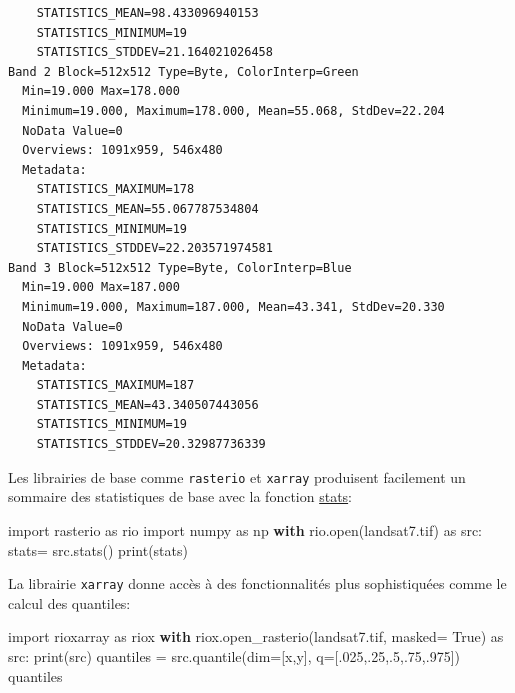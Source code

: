 \documentclass[
  11pt,
  letterpaper,
  open=any,
  twoside=false,
  french]{scrbook}
\newenvironment{Shaded}{\begin{snugshade}}{\end{snugshade}}
\newcommand{\BuiltInTok}[1]{\textcolor[rgb]{0.00,0.23,0.31}{#1}}
\newcommand{\ControlFlowTok}[1]{\textcolor[rgb]{0.00,0.23,0.31}{\textbf{#1}}}
\newcommand{\FloatTok}[1]{\textcolor[rgb]{0.68,0.00,0.00}{#1}}
\newcommand{\ImportTok}[1]{\textcolor[rgb]{0.00,0.46,0.62}{#1}}
\newcommand{\NormalTok}[1]{\textcolor[rgb]{0.00,0.23,0.31}{#1}}
\newcommand{\OperatorTok}[1]{\textcolor[rgb]{0.37,0.37,0.37}{#1}}
\newcommand{\StringTok}[1]{\textcolor[rgb]{0.13,0.47,0.30}{#1}}
\newcommand{\VariableTok}[1]{\textcolor[rgb]{0.07,0.07,0.07}{#1}}
\begin{document}
\begin{verbatim}
    STATISTICS_MEAN=98.433096940153
    STATISTICS_MINIMUM=19
    STATISTICS_STDDEV=21.164021026458
Band 2 Block=512x512 Type=Byte, ColorInterp=Green
  Min=19.000 Max=178.000 
  Minimum=19.000, Maximum=178.000, Mean=55.068, StdDev=22.204
  NoData Value=0
  Overviews: 1091x959, 546x480
  Metadata:
    STATISTICS_MAXIMUM=178
    STATISTICS_MEAN=55.067787534804
    STATISTICS_MINIMUM=19
    STATISTICS_STDDEV=22.203571974581
Band 3 Block=512x512 Type=Byte, ColorInterp=Blue
  Min=19.000 Max=187.000 
  Minimum=19.000, Maximum=187.000, Mean=43.341, StdDev=20.330
  NoData Value=0
  Overviews: 1091x959, 546x480
  Metadata:
    STATISTICS_MAXIMUM=187
    STATISTICS_MEAN=43.340507443056
    STATISTICS_MINIMUM=19
    STATISTICS_STDDEV=20.32987736339
\end{verbatim}

Les librairies de base comme \texttt{rasterio} et \texttt{xarray}
produisent facilement un sommaire des statistiques de base avec la
fonction
\href{https://rasterio.readthedocs.io/en/stable/api/rasterio.io.html\#rasterio.io.BufferedDatasetWriter.stats}{stats}:

\begin{Shaded}
\begin{Highlighting}[]
\ImportTok{import}\NormalTok{ rasterio }\ImportTok{as}\NormalTok{ rio}
\ImportTok{import}\NormalTok{ numpy }\ImportTok{as}\NormalTok{ np}
\ControlFlowTok{with}\NormalTok{ rio.}\BuiltInTok{open}\NormalTok{(}\StringTok{\textquotesingle{}landsat7.tif\textquotesingle{}}\NormalTok{) }\ImportTok{as}\NormalTok{ src:}
\NormalTok{    stats}\OperatorTok{=}\NormalTok{ src.stats()}
    \BuiltInTok{print}\NormalTok{(stats)}
\end{Highlighting}
\end{Shaded}

La librairie \texttt{xarray} donne accès à des fonctionnalités plus
sophistiquées comme le calcul des quantiles:

\begin{Shaded}
\begin{Highlighting}[]
\ImportTok{import}\NormalTok{ rioxarray }\ImportTok{as}\NormalTok{ riox}
\ControlFlowTok{with}\NormalTok{ riox.open\_rasterio(}\StringTok{\textquotesingle{}landsat7.tif\textquotesingle{}}\NormalTok{, masked}\OperatorTok{=} \VariableTok{True}\NormalTok{) }\ImportTok{as}\NormalTok{ src:}
    \BuiltInTok{print}\NormalTok{(src)}
\NormalTok{quantiles }\OperatorTok{=}\NormalTok{ src.quantile(dim}\OperatorTok{=}\NormalTok{[}\StringTok{\textquotesingle{}x\textquotesingle{}}\NormalTok{,}\StringTok{\textquotesingle{}y\textquotesingle{}}\NormalTok{], q}\OperatorTok{=}\NormalTok{[}\FloatTok{.025}\NormalTok{,}\FloatTok{.25}\NormalTok{,}\FloatTok{.5}\NormalTok{,}\FloatTok{.75}\NormalTok{,}\FloatTok{.975}\NormalTok{])}
\NormalTok{quantiles}
\end{Highlighting}
\end{Shaded}
\end{document}
